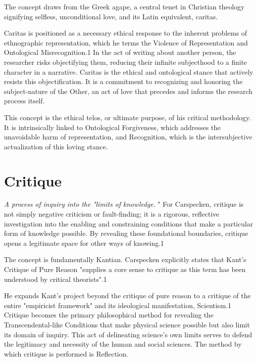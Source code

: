 \documentclass{book}
\begin{document}
The concept draws from the Greek agape, a central tenet in Christian theology signifying selfless, unconditional love, and its Latin equivalent, caritas.

Caritas is positioned as a necessary ethical response to the inherent problems of ethnographic representation, which he terms the Violence of Representation and Ontological Misrecognition.1 In the act of writing about another person, the researcher risks objectifying them, reducing their infinite subjecthood to a finite character in a narrative. Caritas is the ethical and ontological stance that actively resists this objectification. It is a commitment to recognizing and honoring the subject-nature of the Other, an act of love that precedes and informs the research process itself.

This concept is the ethical telos, or ultimate purpose, of his critical methodology. It is intrinsically linked to Ontological Forgiveness, which addresses the unavoidable harm of representation, and Recognition, which is the intersubjective actualization of this loving stance.

\parencite{HenzeCarspecken2018}


\section{Critique}

\textit{A process of inquiry into the "limits of knowledge.} " For Carspecken, critique is not simply negative criticism or fault-finding; it is a rigorous, reflective investigation into the enabling and constraining conditions that make a particular form of knowledge possible. By revealing these foundational boundaries, critique opens a legitimate space for other ways of knowing.1

The concept is fundamentally Kantian. Carspecken explicitly states that Kant's Critique of Pure Reason "supplies a core sense to critique as this term has been understood by critical theorists".1

He expands Kant's project beyond the critique of pure reason to a critique of the entire "empiricist framework" and its ideological manifestation, Scientism.1 Critique becomes the primary philosophical method for revealing the Transcendental-like Conditions that make physical science possible but also limit its domain of inquiry. This act of delineating science's own limits serves to defend the legitimacy and necessity of the human and social sciences. The method by which critique is performed is Reflection.
\end{document}
